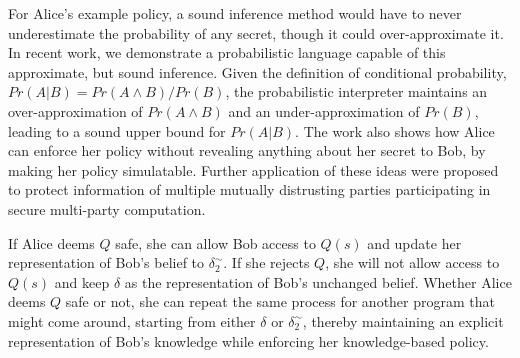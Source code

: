 \documentclass{article} %
\newcommand{\pxm}[1]{\textcolor{red}{PM -- #1}}
\newcommand{\sconst}[1]{\ensuremath{\mathsf{#1}}}
\newcommand{\strue}{\sconst{True}}
\newcommand{\sfalse}{\sconst{False}}
\newcommand{\paren}[1]{\left( #1 \right)}
\newcommand{\acond}[0]{|^\sim}
\newcommand{\stacklabel}[1]{\stackrel{\smash{\scriptscriptstyle \mathrm{#1}}}}
\newcommand{\defeq}{\stacklabel{def}=}
\theoremstyle{plain} %
\theoremstyle{definition} %
\begin{document}
For Alice's example policy, a sound inference method would have to
never underestimate the probability of any secret, though it could
over-approximate it. In recent work\cite{mardziel11belief}, we
demonstrate a probabilistic language capable of this approximate, but
sound inference. Given the definition of conditional probability, $
Pr(A | B) = Pr(A \wedge B) / Pr(B) $, the probabilistic interpreter
maintains an over-approximation of $ Pr(A \wedge B) $ and an
under-approximation of $ Pr(B) $, leading to a sound upper bound for $
Pr(A | B) $. The work also shows how Alice can enforce her policy
without revealing anything about her secret to Bob, by making her
policy simulatable\cite{kenthapadi05simulatable}. Further application
of these ideas were proposed to protect information of multiple
mutually distrusting parties participating in secure multi-party
computation\cite{mardziel12smc}.

%
%

%

If Alice deems $ Q $ safe, she can allow Bob access to $ Q(s) $
and update her representation of Bob's belief to $
\delta_2^\sim $. If she rejects $ Q $, she will not allow access to $ Q(s) $ and keep
$ \delta $ as the representation of Bob's unchanged belief. Whether
Alice deems $ Q $ safe or not, she can repeat the same process for
another program that might come around, starting from either $ \delta
$ or $ \delta_2^\sim $, thereby maintaining an explicit representation
of Bob's knowledge while enforcing her knowledge-based policy.
\end{document}
